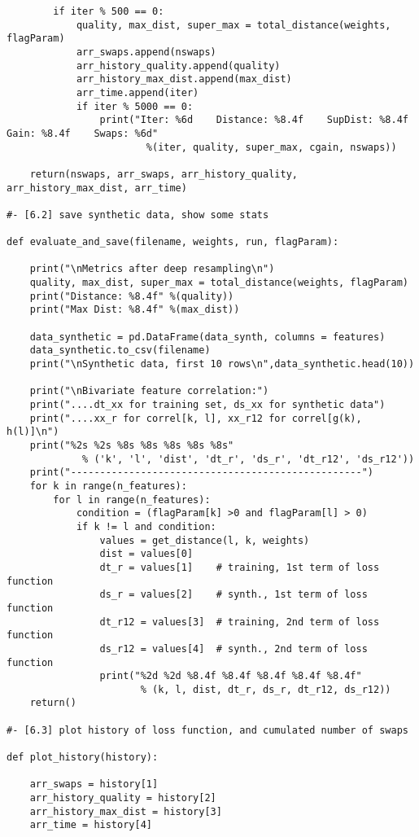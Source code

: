 \documentclass[oneside,10pt]{book}
\begin{document}
\begin{lstlisting}
        if iter % 500 == 0: 
            quality, max_dist, super_max = total_distance(weights, flagParam)
            arr_swaps.append(nswaps)
            arr_history_quality.append(quality)
            arr_history_max_dist.append(max_dist)
            arr_time.append(iter)
            if iter % 5000 == 0:
                print("Iter: %6d    Distance: %8.4f    SupDist: %8.4f    Gain: %8.4f    Swaps: %6d"  
                        %(iter, quality, super_max, cgain, nswaps)) 

    return(nswaps, arr_swaps, arr_history_quality, arr_history_max_dist, arr_time)

#- [6.2] save synthetic data, show some stats

def evaluate_and_save(filename, weights, run, flagParam): 

    print("\nMetrics after deep resampling\n")
    quality, max_dist, super_max = total_distance(weights, flagParam)
    print("Distance: %8.4f" %(quality)) 
    print("Max Dist: %8.4f" %(max_dist)) 

    data_synthetic = pd.DataFrame(data_synth, columns = features)
    data_synthetic.to_csv(filename)
    print("\nSynthetic data, first 10 rows\n",data_synthetic.head(10))

    print("\nBivariate feature correlation:")
    print("....dt_xx for training set, ds_xx for synthetic data")
    print("....xx_r for correl[k, l], xx_r12 for correl[g(k), h(l)]\n")
    print("%2s %2s %8s %8s %8s %8s %8s" 
             % ('k', 'l', 'dist', 'dt_r', 'ds_r', 'dt_r12', 'ds_r12'))
    print("--------------------------------------------------")
    for k in range(n_features):
        for l in range(n_features):
            condition = (flagParam[k] >0 and flagParam[l] > 0) 
            if k != l and condition:
                values = get_distance(l, k, weights)
                dist = values[0]
                dt_r = values[1]    # training, 1st term of loss function
                ds_r = values[2]    # synth., 1st term of loss function
                dt_r12 = values[3]  # training, 2nd term of loss function
                ds_r12 = values[4]  # synth., 2nd term of loss function
                print("%2d %2d %8.4f %8.4f %8.4f %8.4f %8.4f" 
                       % (k, l, dist, dt_r, ds_r, dt_r12, ds_r12)) 
    return()

#- [6.3] plot history of loss function, and cumulated number of swaps

def plot_history(history):

    arr_swaps = history[1]
    arr_history_quality = history[2]
    arr_history_max_dist = history[3]
    arr_time = history[4]


\end{lstlisting}
\end{document}
